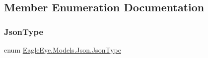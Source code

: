 \subsection{Member Enumeration Documentation}
\mbox{\label{class_eagle_eye_1_1_models_1_1_json_afdf0e16163f8b9bab5b45d6d01e8133c}} 
\subsubsection{\texorpdfstring{JsonType}{JsonType}}
{\footnotesize\ttfamily enum \mbox{\hyperlink{class_eagle_eye_1_1_models_1_1_json_afdf0e16163f8b9bab5b45d6d01e8133c}{Eagle\+Eye.\+Models.\+Json.\+Json\+Type}}\hspace{0.3cm}{\ttfamily [strong]}}

